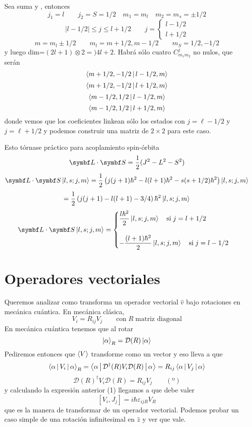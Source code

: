 \documentclass[10pt,oneside]{CBFT_book}
\begin{document}
Sea suma  y , entonces 
\[
	j_1 = l \qquad j_2 = S= 1/2 \quad m_1=m_l \quad m_2=m_s = \pm 1/2
\]
\[
	|l - 1/2| \leq j \leq l + 1/2  \qquad j=\begin{cases} l-1/2 \\ l+1/2\end{cases}
\]
\[
	m = m_l \pm 1/2 \qquad m_l = m + 1/2 , m- 1/2 \qquad m_S = 1/2, -1/2
\]
y luego dim=$(2l+1)\otimes 2 =) 4l+2$.
Habrá sólo cuatro $C_{m_1 m_2}^j$ no nulos, que serán 
\[
	\Braket{ m + 1/2, -1/2 | l - 1/2, m }
\]
\[
	\Braket{ m + 1/2, -1/2 | l + 1/2, m }
\]
\[
	\Braket{ m - 1/2, 1/2 | l - 1/2, m }
\]
\[
	\Braket{ m - 1/2, 1/2 | l + 1/2, m }
\]
donde vemos que los coeficientes linkean sólo los estados con $j=\ell-1/2$ y $j=\ell+1/2$ y podemos construir 
una matriz de $2\times 2$ para este caso.

Esto tórnase práctico para acoplamiento spin-órbita 
\[
	\vb{L}\cdot\vb{S} = \frac{1}{2}(J^2 - L^2 - S^2)
\]
\[
	\vb{L}\cdot\vb{S} \Ket{l,s;j,m} =  \frac{1}{2}\left( j(j+1)\hbar^2 - 
		l(l+1)\hbar^2 - s(s+1/2)\hbar^2 \right) \Ket{l,s;j,m}
\]
\[
	= \frac{1}{2}\left( j(j+1) - l(l+1) - 3/4 \right) \hbar^2 \Ket{l,s;j,m}
\]
\[
	\vb{L}\cdot\vb{S} \Ket{l,s;j,m} = \begin{cases} 
		\displaystyle \frac{l\hbar^2}{2} \Ket{l,s;j,m} \quad \text{si} \; j=l+1/2\\ 
		\\
		\displaystyle -\frac{(l+1)\hbar^2}{2}\Ket{l,s;j,m} \quad \text{si} \; j=l-1/2
	\end{cases}
\]

\section{Operadores vectoriales}

Queremos analizar como transforma un operador vectorial $\hat{v}$ bajo rotaciones en mecánica cuántica.
En mecánica clásica,
\[
	V_i = R_{ij} V_j \qquad \text{con} \; R \; \text{matriz diagonal}
\]
En mecánica cuántica tenemos que al rotar
\[
	\Ket{\alpha}_R = \mathcal{D}(R)\Ket{\alpha}
\]
Pediremos entonces que $\Braket{V}$ transforme como un vector y eso lleva a que 
\[
	\Braket{\alpha|V_i|\alpha}_R = \Braket{\alpha|\mathcal{D}^\dagger(R)V_i\mathcal{D}(R)|\alpha} =
	R_{ij} \Braket{\alpha|V_j|\alpha}
\]
\[
	\mathcal{D}(R)^\dagger V_i \mathcal{D}(R) = R_{ij}V_j \qquad (º)
\]
y calculando la expresión anterior (1) llegamos a que debe valer
\[
	[V_i,J_j] =  i\hbar \varepsilon_{ijR}V_R
\]
que es la manera de transformar de un operador vectorial. Podemos probar un caso simple de una rotación 
infinitesimal en $\hat{z}$ y ver que vale.
\end{document}
